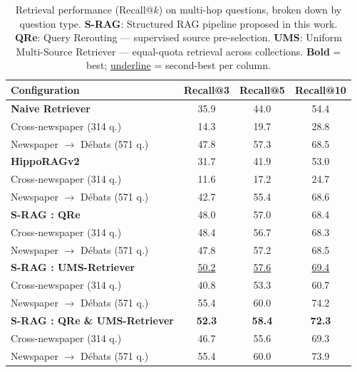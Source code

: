 \begin{table}[ht]
\centering
\caption{Retrieval performance (Recall@$k$) on multi-hop questions, broken down by
question type.
\textbf{S-RAG}: Structured RAG pipeline proposed in this work.
\textbf{QRe}: Query Rerouting — supervised source pre-selection.
\textbf{UMS}: Uniform Multi-Source Retriever — equal-quota retrieval across collections.
\textbf{Bold} = best; \underline{underline} = second-best per column.}
\label{tab:retrieval-results}
\small
\setlength{\tabcolsep}{0pt}
\begin{tabular*}{\textwidth}{@{\extracolsep{\fill}} l ccc @{}}
\toprule
\textbf{Configuration}
  & \textbf{Recall@3}
  & \textbf{Recall@5}
  & \textbf{Recall@10} \\
\midrule

\rowcolor{sectiongray}
\textbf{Naive Retriever}~\cite{historiqa} & 35.9 & 44.0 & 54.4 \\
\quad Cross-newspaper (314 q.)            & 14.3 & 19.7 & 28.8 \\
\quad Newspaper $\rightarrow$ Débats (571 q.) & 47.8 & 57.3 & 68.5 \\

\midrule
\rowcolor{sectiongray}
\textbf{HippoRAGv2}~\cite{hipporagv2}       & 31.7 & 41.9 & 53.0 \\
\quad Cross-newspaper (314 q.)            & 11.6 & 17.2 & 24.7 \\
\quad Newspaper $\rightarrow$ Débats (571 q.) & 42.7 & 55.4 & 68.6 \\

\midrule
\rowcolor{sectiongray}
\textbf{S-RAG : QRe}                     & 48.0 & 57.0 & 68.4 \\
\quad Cross-newspaper (314 q.)            & 48.4 & 56.7 & 68.3 \\
\quad Newspaper $\rightarrow$ Débats (571 q.) & 47.8 & 57.2 & 68.5 \\

\rowcolor{sectiongray}
\textbf{S-RAG : UMS-Retriever}           & \underline{50.2} & \underline{57.6} & \underline{69.4} \\
\quad Cross-newspaper (314 q.)            & 40.8 & 53.3 & 60.7 \\
\quad Newspaper $\rightarrow$ Débats (571 q.) & 55.4 & 60.0 & 74.2 \\

\midrule
\rowcolor{sectiongray}
\textbf{S-RAG : QRe \& UMS-Retriever}   & \textbf{52.3} & \textbf{58.4} & \textbf{72.3} \\
\quad Cross-newspaper (314 q.)            & 46.7 & 55.6 & 69.3 \\
\quad Newspaper $\rightarrow$ Débats (571 q.) & 55.4 & 60.0 & 73.9 \\

\bottomrule
\end{tabular*}
\end{table}

